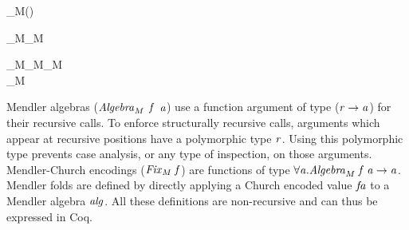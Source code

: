 \begin{hscode}\SaveRestoreHook
{}%
%
%
\>[3]{}\;_M\;\;\mathrel{=}\forall {}\hsforall {}(\to {})\to {}\;\to {}\<[E]%
\ColumnHook
\end{hscode}\resethooks
\begin{hscode}\SaveRestoreHook
{}%
%
%
\>[3]{}\;_M\;\mathrel{=}\forall {}\hsforall {}_M\;\;\to {}\<[E]%
\ColumnHook
\end{hscode}\resethooks
\begin{hscode}\SaveRestoreHook
{}%
%
%
\>[3]{}_M\mathbin{::}_M\;\;\to {}_M\;\to {}\<[E]%
\\
\>[3]{}_M\;\;\mathrel{=}\;\<[E]%
\ColumnHook
\end{hscode}\resethooks
Mendler algebras (\ensuremath{\Varid{Algebra}_M} \ensuremath{\Varid{f}} \ensuremath{\Varid{a}}) use a function argument of type (\ensuremath{\Varid{r}\to \Varid{a}}) for their recursive calls. To enforce structurally recursive
calls, arguments which appear at recursive positions have a
polymorphic type \ensuremath{\Varid{r}}.  Using this polymorphic type prevents case
analysis, or any type of inspection, on those arguments.
Mendler-Church encodings (\ensuremath{\Varid{Fix}_M\;\Varid{f}}) are functions of type \ensuremath{\forall \Varid{a}\hsforall \hsdot{\circ }{.}\Varid{Algebra}_M\;\Varid{f}\;\Varid{a}\to \Varid{a}}.  Mendler folds are defined by directly applying a
Church encoded value \ensuremath{\Varid{fa}} to a Mendler algebra \ensuremath{\Varid{alg}}. All these
definitions are non-recursive and can thus be expressed in Coq.



